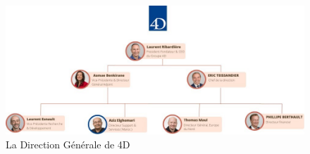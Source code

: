 \begin{figure}[h]
    \centering
    \includegraphics[scale=0.6]{Images/direction.jpg} %
    \caption{La Direction Générale de 4D}
    \label{fig:direction}
\end{figure}





